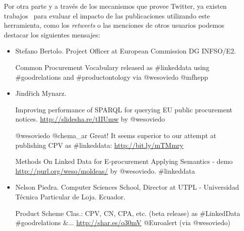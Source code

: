 Por otra parte y a través de los mecanismos que provee Twitter, ya existen trabajos~\cite{tweet-impact} para evaluar
el impacto de las publicaciones utilizando este herramienta, como los \textit{retweets} o las menciones de otros
usuarios podemos destacar los siguientes mensajes:

\begin{itemize}

\item Stefano Bertolo. Project Officer at European Commission DG INFSO/E2.

\begin{Frame}
\begin{itshape}
Common Procurement Vocabulary released as \#linkeddata using \#goodrelations and \#productontology via @wesoviedo @mfhepp
\end{itshape}
\end{Frame}

\item Jindřich Mynarz.

\begin{Frame}
\begin{itshape}
Improving performance of SPARQL for querying EU public procurement notices. \url{http://slidesha.re/tIIUmw} by @wesoviedo
\end{itshape}
\end{Frame}


\begin{Frame}
\begin{itshape}
@wesoviedo @chema\_ar Great! It seems superior to our attempt at publishing CPV as \#linkeddata: \url{http://bit.ly/mTMmry}
\end{itshape}
\end{Frame}


\begin{Frame}
\begin{itshape}
Methods On Linked Data for E-procurement Applying Semantics - demo \url{http://purl.org/weso/moldeas/} by @wesoviedo. \#linkeddata
\end{itshape}
\end{Frame}


\item Nelson Piedra. Computer Sciences School, Director at UTPL - Universidad Técnica Particular de Loja. Ecuador.

\begin{Frame}
\begin{itshape}
Product Scheme Clas.: CPV, CN, CPA, etc. (beta release) as \#LinkedData \#goodrelations \&... \url{http://shar.es/o30mV} @Euroalert (via @wesoviedo)
\end{itshape}
\end{Frame}


\end{itemize}

